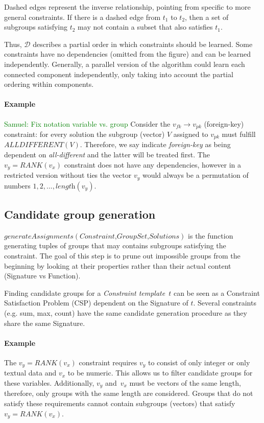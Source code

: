 \documentclass{ecai}
\newcommand{\samuel}[1]{\textcolor{green}{{\sc Samuel:} #1}\xspace}
\newcommand{\format}[1]{\textit{#1}\xspace}
\newcommand{\generategroups}{\format{generateAssignments}}
\newcommand{\template}{\format{Constraint template}}
\newcommand{\CSignature}{Signature\xspace}
\newcommand{\CFunction}{Function\xspace}
\newcommand{\dependencies}{\ensuremath{\mathcal{D}}\xspace}
\newcommand{\eccalc}[2]{\ensuremath{#1 = #2}}
\newcommand{\ecrank}[2]{\eccalc{#1}{\mathit{RANK}(#2)}}
\newcommand{\ecfkey}[2]{\ensuremath{#1 \rightarrow #2}}
\newcommand{\ecalldiff}[1]{\ensuremath{\mathit{ALLDIFFERENT}(#1)}}
\begin{document}
Dashed edges represent the inverse relationship, pointing from specific to more general constraints.
If there is a dashed edge from $t_1$ to $t_2$, then a set of subgroups satisfying $t_2$ may not contain a subset that also satisfies $t_1$.

Thus, \dependencies describes a partial order in which constraints should be learned.
Some constraints have no dependencies (omitted from the figure) and can be learned independently.
Generally, a parallel version of the algorithm could learn each connected component independently, only taking into account the partial ordering within components.

\paragraph{Example}
\samuel{Fix notation variable vs. group}
Consider the \ecfkey{v_{fk}}{v_{pk}} (foreign-key) constraint: for every solution the subgroup (vector) $V$ assigned to $\mathit{v_{pk}}$ must fulfill \ecalldiff{V}.
Therefore, we say indicate \textit{foreign-key} as being dependent on \textit{all-different} and the latter will be treated first.
The \ecrank{v_y}{v_x} constraint does not have any dependencies, however in a restricted version without ties the vector $v_y$ would always be a permutation of numbers $1, 2, ..., \textit{length}(v_y)$.

\subsection{Candidate group generation}
$\generategroups(\textit{Constraint,GroupSet,Solutions})$ is the function generating tuples of groups that may contains subgroups satisfying the constraint.
The goal of this step is to prune out impossible groups from the beginning by looking at their properties rather than their actual content (\CSignature vs \CFunction).

Finding candidate groups for a \template~$t$ can be seen as a Constraint Satisfaction Problem (CSP) dependent on the \CSignature of $t$.
Several constraints (e.g. sum, max, count) have the same candidate generation procedure as they share the same \CSignature.

\paragraph{Example}
The \ecrank{v_y}{v_x} constraint requires $v_y$ to consist of only integer or only textual data and $v_x$ to be numeric.
This allows us to filter candidate groups for these variables.
Additionally, $v_y$ and~$v_x$ must be vectors of the same length, therefore, only groups with the same length are considered.
Groups that do not satisfy these requirements cannot contain subgroups (vectors) that satisfy \ecrank{v_y}{v_x}.
\end{document}

